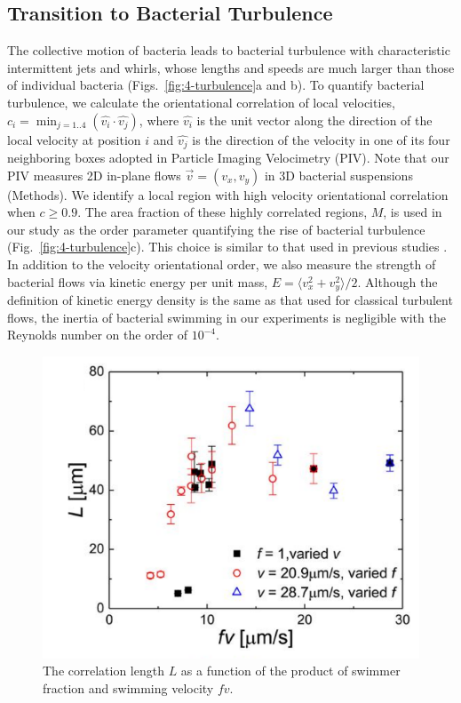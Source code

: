 \subsection{Transition to Bacterial Turbulence}
The collective motion of bacteria leads to bacterial turbulence with characteristic intermittent jets and whirls, whose lengths and speeds are much larger than those of individual bacteria (Figs.~\ref{fig:4-turbulence}a and b). To quantify bacterial turbulence, we calculate the orientational correlation of local velocities, $c_i=\min_{j=1..4}(\hat{v_i}\cdot\hat{v_j})$, where $\hat{v_i}$ is the unit vector along the direction of the local velocity at position $i$ and $\hat{v_j}$ is the direction of the velocity in one of its four neighboring boxes adopted in Particle Imaging Velocimetry (PIV).
Note that our PIV measures 2D in-plane flows $\vec{v}=(v_x, v_y)$ in 3D bacterial suspensions (Methods). We identify a local region with high velocity orientational correlation when $c \ge 0.9$. The area fraction of these highly correlated regions, $M$, is used in our study as the order parameter quantifying the rise of bacterial turbulence (Fig.~\ref{fig:4-turbulence}c). This choice is similar to that used in previous studies \cite{Cisneros2011}. In addition to the velocity orientational order, we also measure the strength of bacterial flows via kinetic energy per unit mass, $E=\langle v_x^2 + v_y^2 \rangle / 2$.
Although the definition of kinetic energy density is the same as that used for classical turbulent flows, the inertia of bacterial swimming in our experiments is negligible with the Reynolds number on the order of $10^{-4}$.

\begin{figure}[!hp]
	\begin{center}
	\includegraphics[width=4 in]{Figs/4-Emergence/S2C.pdf}
	\end{center}
	\caption[The Velocity Correlation Length]
	{
	The correlation length $L$ as a function of the product of swimmer fraction and swimming velocity $fv$.
  }
	\label{fig:4-correlation-length}
\end{figure}

